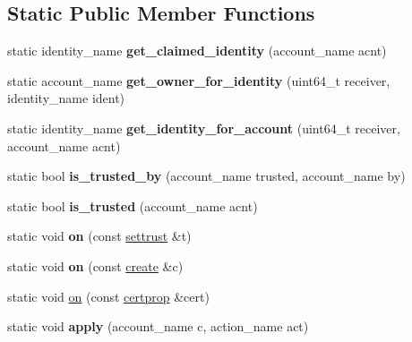 \subsection*{Static Public Member Functions}
\begin{DoxyCompactItemize}
\item 
\mbox{\label{classidentity_1_1contract_ae0274b72d338a8e60956886c620ca031}} 
static identity\+\_\+name {\bfseries get\+\_\+claimed\+\_\+identity} (account\+\_\+name acnt)
\item 
\mbox{\label{classidentity_1_1contract_a42cd091aa01ebf7788328d091f3efd37}} 
static account\+\_\+name {\bfseries get\+\_\+owner\+\_\+for\+\_\+identity} (uint64\+\_\+t receiver, identity\+\_\+name ident)
\item 
\mbox{\label{classidentity_1_1contract_a74e0609cf0e4ff01ba9282018a71ad48}} 
static identity\+\_\+name {\bfseries get\+\_\+identity\+\_\+for\+\_\+account} (uint64\+\_\+t receiver, account\+\_\+name acnt)
\item 
\mbox{\label{classidentity_1_1contract_a6f4436609a421a613c4376c66e14c5bd}} 
static bool {\bfseries is\+\_\+trusted\+\_\+by} (account\+\_\+name trusted, account\+\_\+name by)
\item 
\mbox{\label{classidentity_1_1contract_ad5525997684899c14a5281a7b2aa0db5}} 
static bool {\bfseries is\+\_\+trusted} (account\+\_\+name acnt)
\item 
\mbox{\label{classidentity_1_1contract_a06bb74a9a635a4b23498df4fc7b91be9}} 
static void {\bfseries on} (const \mbox{\hyperlink{structidentity_1_1contract_1_1settrust}{settrust}} \&t)
\item 
\mbox{\label{classidentity_1_1contract_a2d3a9107ed038a4d3d0c2a4b972aef82}} 
static void {\bfseries on} (const \mbox{\hyperlink{structidentity_1_1contract_1_1create}{create}} \&c)
\item 
static void \mbox{\hyperlink{classidentity_1_1contract_ae1223cdb3abe5357783ef6f516dfc7de}{on}} (const \mbox{\hyperlink{structidentity_1_1contract_1_1certprop}{certprop}} \&cert)
\item 
\mbox{\label{classidentity_1_1contract_a12f6a905f4c91c94e1d9f2f5459ad8b5}} 
static void {\bfseries apply} (account\+\_\+name c, action\+\_\+name act)
\end{DoxyCompactItemize}

